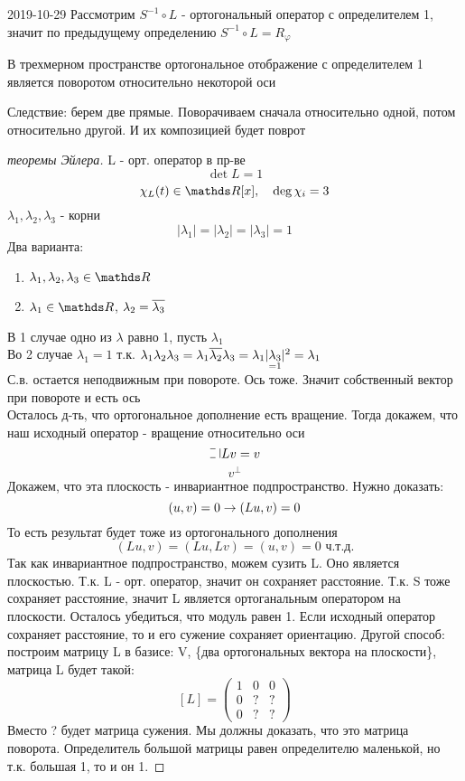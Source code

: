 \documentclass[main]{subfiles}
\begin{document}
\begin{lect}{2019-10-29}
    Рассмотрим $S^{-1} \circ L$ - ортогональный оператор с определителем 1, значит по предыдущему определению $S^{-1} \circ L = R_{\varphi}$

    \begin{utv}
      В трехмерном пространстве ортогональное отображение с определителем 1 является поворотом относительно некоторой оси
    \end{utv}

    Следствие: берем две прямые. Поворачиваем сначала относительно одной, потом относительно другой. И их композицией будет поврот

    \begin{proof}[теоремы Эйлера]
      L - орт. оператор в пр-ве
      \[\det L = 1\]
      \[\chi_L(t) \in \R[x],\q \deg \chi_i = 3\]
      $\lambda_1, \lambda_2, \lambda_3$ - корни
      \[|\lambda_1| = |\lambda_2| = |\lambda_3| = 1\]
      Два варианта:
      \begin{enumerate}
        \item $\lambda_1, \lambda_2, \lambda_3 \in \R$
        \item $\lambda_1 \in \R$, $\lambda_2 = \overline{\lambda_3}$
      \end{enumerate}
      В 1 случае одно из $\lambda$ равно 1, пусть $\lambda_1$\\
      Во 2 случае $\lambda_1 = 1$ т.к. $\lambda_1 \lambda_2 \lambda_3 = \lambda_1 \overline{\lambda_2} \lambda_3 = \lambda_1 |\underset{=1}{\lambda_3}|^2 = \lambda_1$\\
      С.в. остается неподвижным при повороте. Ось тоже. Значит собственный вектор  при повороте и есть ось\\
      Осталось д-ть, что ортогональное дополнение есть вращение. Тогда докажем, что наш исходный оператор - вращение относительно оси
      \[\letus Lv = v\]
      \[v^{\bot}\]
      Докажем, что эта плоскость - инвариантное подпространство. Нужно доказать:
      \[(u,v) = 0 \rightarrow (Lu, v) = 0\]
      То есть результат будет тоже из ортогонального дополнения
      \[(Lu,v) = (Lu, Lv) = (u,v) = 0 \text{ ч.т.д.}\]
      Так как инвариантное подпространство, можем сузить L. Оно является плоскостью. Т.к. L - орт. оператор, значит он сохраняет расстояние. Т.к. S тоже сохраняет расстояние, значит L является ортоганальным оператором на плоскости. Осталось убедиться, что модуль равен 1. Если исходный оператор сохраняет расстояние, то и его сужение сохраняет ориентацию. Другой способ: построим матрицу L в базисе: V, \{два ортогональных вектора на плоскости\}, матрица L будет такой:\\
      \[[L] = \begin{pmatrix}
        1 & 0 & 0\\
        0 & ? & ?\\
        0 & ? & ?
      \end{pmatrix}\]
      Вместо ? будет матрица сужения. Мы должны доказать, что это матрица поворота. Определитель большой матрицы равен определителю маленькой, но т.к. большая 1, то и он 1.


\end{proof}
\end{lect}
\end{document}
